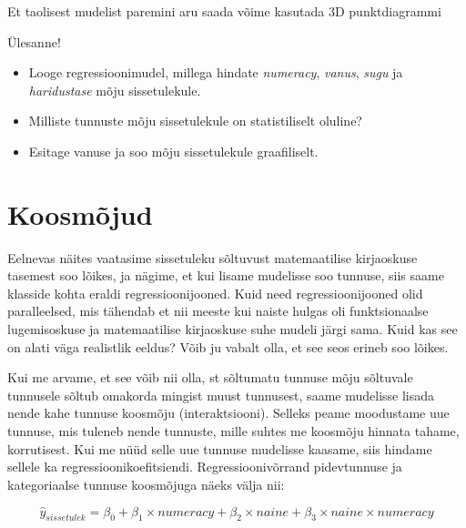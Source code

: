 \documentclass[
]{book}
\newenvironment{Shaded}{\begin{snugshade}}{\end{snugshade}}
\newcommand{\CommentTok}[1]{\textcolor[rgb]{0.56,0.35,0.01}{\textit{#1}}}
\providecommand{\tightlist}{%
  \setlength{\itemsep}{0pt}\setlength{\parskip}{0pt}}
\begin{document}
Et taolisest mudelist paremini aru saada võime kasutada 3D punktdiagrammi

\begin{Shaded}
\end{Shaded}

Ülesanne!

\begin{itemize}
\tightlist
\item
  Looge regressioonimudel, millega hindate \emph{numeracy}, \emph{vanus}, \emph{sugu} ja \emph{haridustase} mõju sissetulekule.
\item
  Milliste tunnuste mõju sissetulekule on statistiliselt oluline?
\item
  Esitage vanuse ja soo mõju sissetulekule graafiliselt.
\end{itemize}

\hypertarget{koosmuxf5jud}{%
\section{Koosmõjud}\label{koosmuxf5jud}}

Eelnevas näites vaatasime sissetuleku sõltuvust matemaatilise kirjaoskuse tasemest soo lõikes, ja nägime, et kui lisame mudelisse soo tunnuse, siis saame klasside kohta eraldi regressioonijooned. Kuid need regressioonijooned olid paralleelsed, mis tähendab et nii meeste kui naiste hulgas oli funktsionaalse lugemisoskuse ja matemaatilise kirjaoskuse suhe mudeli järgi sama. Kuid kas see on alati väga realistlik eeldus? Võib ju vabalt olla, et see seos erineb soo lõikes.

Kui me arvame, et see võib nii olla, st sõltumatu tunnuse mõju sõltuvale tunnusele sõltub omakorda mingist muust tunnusest, saame mudelisse lisada nende kahe tunnuse koosmõju (interaktsiooni). Selleks peame moodustame uue tunnuse, mis tuleneb nende tunnuste, mille suhtes me koosmõju hinnata tahame, korrutisest. Kui me nüüd selle uue tunnuse mudelisse kaasame, siis hindame sellele ka regressioonikoefitsiendi. Regressioonivõrrand pidevtunnuse ja kategoriaalse tunnuse koosmõjuga näeks välja nii:

\[\hat{y}_{sissetulek}=\beta_0+\beta_1 \times numeracy + \beta_2 \times naine + \beta_3 \times naine \times numeracy \]
\end{document}
